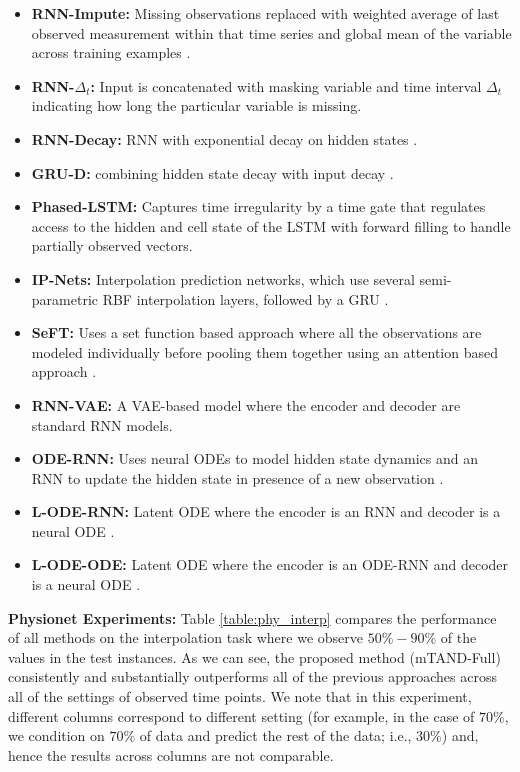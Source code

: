 \begin{itemize}[leftmargin=*]
     \item \textbf{RNN-Impute:} Missing observations replaced with weighted average of last observed measurement within that time series and global mean of the variable across training examples \citep{che2016recurrent}.
     \item \textbf{RNN-$\Delta_t$:} Input is concatenated with masking variable and time interval $\Delta_t$ indicating how long the particular variable is missing.
     \item \textbf{RNN-Decay:} RNN with exponential decay on hidden states \citep{mozer2017,che2016recurrent}.
     \item \textbf{GRU-D:} combining hidden state decay with input decay \citep{che2016recurrent}.
     \item \textbf{Phased-LSTM:} Captures time irregularity by a time gate that regulates access to the hidden and cell state of the LSTM \citep{phased2016} with forward filling to handle partially observed vectors. 
     \item \textbf{IP-Nets:} Interpolation prediction networks, which use several semi-parametric RBF interpolation layers, followed by a GRU \citep{shukla2019}.
     \item \textbf{SeFT:} Uses a set function based approach where all the observations are modeled individually before pooling them together using an attention based approach \citep{seft}.
     \item \textbf{RNN-VAE:} A VAE-based model where the encoder and decoder are standard RNN models. 
     \item \textbf{ODE-RNN:} Uses neural ODEs to model hidden state dynamics and an RNN to update the hidden state in presence of a new observation \citep{Rubanova2019}.
    \item \textbf{L-ODE-RNN:}  Latent ODE where the encoder is an RNN and decoder is a neural ODE \citep{neural_ode2018}. 
    \item \textbf{L-ODE-ODE:} Latent ODE where the encoder is an ODE-RNN and decoder is a neural ODE \citep{Rubanova2019}.
\end{itemize}

\textbf{Physionet Experiments:}
Table \ref{table:phy_interp} compares the performance of all methods on the interpolation task where we observe $50\% - 90\%$ of the values in the test instances.
As we can see, the proposed method (mTAND-Full) consistently and substantially outperforms all of the previous approaches across all of the settings of observed time points. We note that in this experiment, different columns correspond to different setting (for example, in the case of $70\%$, we condition on $70\%$ of data and predict the rest of the data; i.e., $30\%$) and, hence the results across columns are not comparable. 


